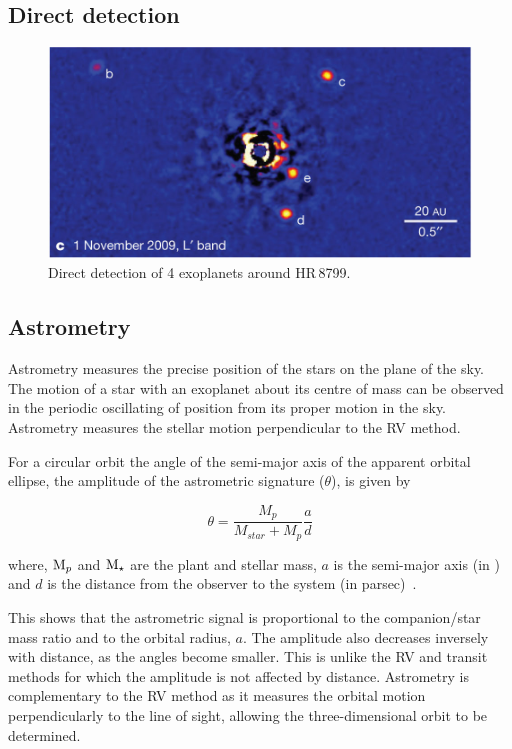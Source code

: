 \subsection{Direct detection}
\label{sub:direct_detection}


\begin{figure}
    \centering
    \includegraphics[width=0.5\linewidth]{figures/introduction/DirectImaging_HR8799_MaroisEtAl2010}
    \caption{Direct detection of 4 exoplanets around HR\,8799.}
    \label{fig:directimaging}
\end{figure}


\subsection{Astrometry}
\label{sub:astrometry}
Astrometry measures the precise position of the stars on the plane of the sky.
The motion of a star with an exoplanet about its centre of mass can be observed in the periodic oscillating of position from its proper motion in the sky.
Astrometry measures the stellar motion perpendicular to the {RV} method.

For a circular orbit the angle of the semi-major axis of the apparent orbital ellipse, the amplitude of the astrometric signature ($\theta$), is given by

\begin{equation} 
\theta = \frac{M_{p}}{M_{star} + M_{p}} \frac{a}{d}
\end{equation}

where, $\textrm{M}_{p}$ and $\textrm{M}_{\star}$ are the plant and stellar mass, $a$ is the semi-major axis (in \AU) and $d$ is the distance from the observer to the system (in parsec)~\citep{perryman_exoplanet_2011}.

This shows that the astrometric signal is proportional to the companion/star mass ratio and to the orbital radius, $a$.
The amplitude also decreases inversely with distance, as the angles become smaller.
This is unlike the {RV} and transit methods for which the amplitude is not affected by distance.
Astrometry is complementary to the {RV} method as it measures the orbital motion perpendicularly to the line of sight, allowing the three-dimensional orbit to be determined.

